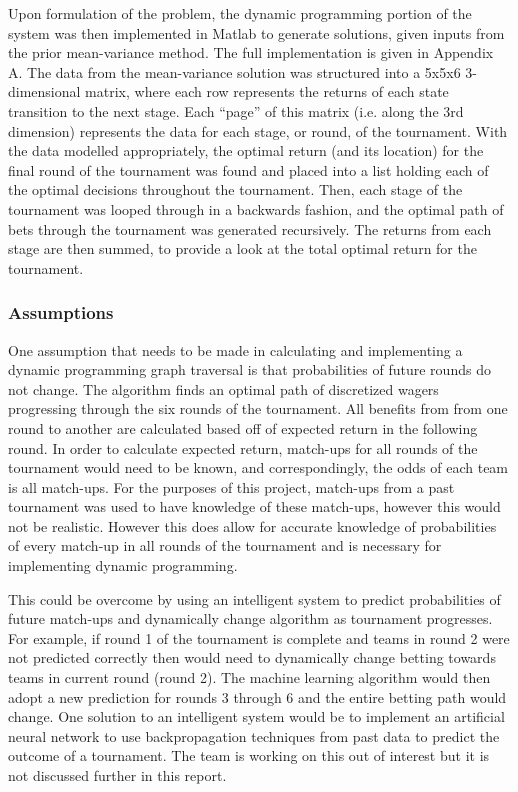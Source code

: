 \documentclass[12pt]{article}
\begin{document}
Upon formulation of the problem, the dynamic programming portion of the system was then implemented in Matlab to generate solutions, given inputs from the prior mean-variance method.
The full implementation is given in Appendix A.
The data from the mean-variance solution was structured into a 5x5x6 3-dimensional matrix, where each row represents the returns of each state transition to the next stage.
Each ``page'' of this matrix (i.e. along the 3rd dimension) represents the data for each stage, or round, of the tournament.
With the data modelled appropriately, the optimal return (and its location) for the final round of the tournament was found and placed into a list holding each of the optimal decisions throughout the tournament.
Then, each stage of the tournament was looped through in a backwards fashion, and the optimal path of bets through the tournament was generated recursively.
The returns from each stage are then summed, to provide a look at the total optimal return for the tournament.

\subsubsection{Assumptions}
One assumption that needs to be made in calculating and implementing a dynamic programming graph traversal is that probabilities of future rounds do not change.
The algorithm finds an optimal path of discretized wagers progressing through the six rounds of the tournament. 
All benefits from from one round to another are calculated based off of expected return in the following round.
In order to calculate expected return, match-ups for all rounds of the tournament would need to be known, and correspondingly, the odds of each team is all match-ups. 
For the purposes of this project, match-ups from a past tournament was used to have knowledge of these match-ups, however this would not be realistic.
However this does allow for accurate knowledge of probabilities of every match-up in all rounds of the tournament and is necessary for implementing dynamic programming.

This could be overcome by using an intelligent system to predict probabilities of future match-ups and dynamically change algorithm as tournament progresses. 
For example, if round 1 of the tournament is complete and teams in round 2 were not predicted correctly then would need to dynamically change betting towards teams in current round (round 2).
The machine learning algorithm would then adopt a new prediction for rounds 3 through 6 and the entire betting path would change.
One solution to an intelligent system would be to implement an artificial neural network to use backpropagation techniques from past data to predict the outcome of a tournament. 
The team is working on this out of interest but it is not discussed further in this report.
\end{document}
